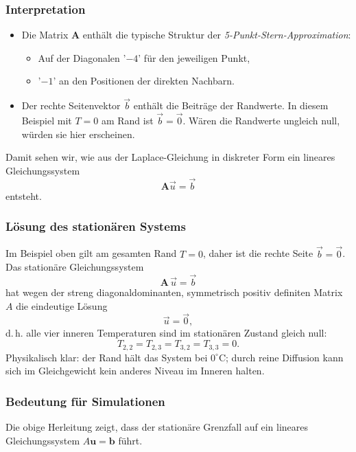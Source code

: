 \subsubsection*{Interpretation}
\begin{itemize}
	\item Die Matrix \(\mathbf{A}\) enthält die typische Struktur der \emph{5-Punkt-Stern-Approximation}: 
	\begin{itemize}
		\item Auf der Diagonalen '$-4$' für den jeweiligen Punkt,
		\item '$-1$' an den Positionen der direkten Nachbarn. 
	\end{itemize} 
	\item Der rechte Seitenvektor $\vec{b}$ enthält die Beiträge der Randwerte.  
	In diesem Beispiel mit $T=0$ am Rand ist $\vec{b}=\vec{0}$.  
	Wären die Randwerte ungleich null, würden sie hier erscheinen. 
\end{itemize}
Damit sehen wir, wie aus der Laplace-Gleichung in diskreter Form ein lineares Gleichungssystem
\[
\mathbf{A} \vec{u}
=
\vec{b}
\]
entsteht.

\subsubsection*{Lösung des stationären Systems}

Im Beispiel oben gilt am gesamten Rand $T=0$, daher ist die rechte Seite $\vec{b}=\vec{0}$.
Das stationäre Gleichungssystem
\[
\mathbf{A}\,\vec{u}=\vec{b}
\]
hat wegen der streng diagonaldominanten, symmetrisch positiv definiten Matrix $A$ die eindeutige Lösung
\[
\vec{u}=\vec{0},
\]
d.\,h. alle vier inneren Temperaturen sind im stationären Zustand gleich null:
\[
T_{2,2}=T_{2,3}=T_{3,2}=T_{3,3}=0.
\]
Physikalisch klar: der Rand hält das System bei $0^\circ$C; durch reine Diffusion kann sich im Gleichgewicht kein anderes Niveau im Inneren halten.


\subsubsection{Bedeutung für Simulationen}

Die obige Herleitung zeigt, dass der stationäre Grenzfall auf ein lineares Gleichungssystem
\(
A \mathbf{u} = \mathbf{b}
\)
führt.  

